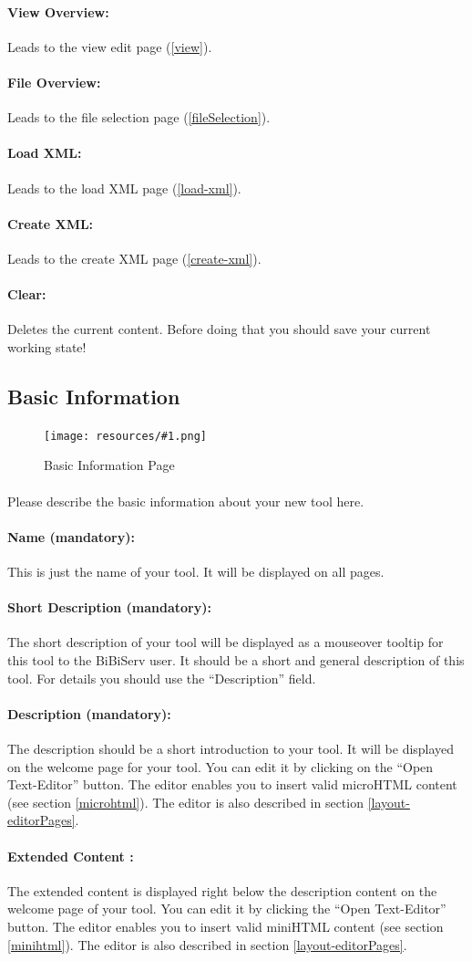 \documentclass[a4paper,10pt]{book}
\newcommand{\bigpic}[1]{\texttt{[image: resources/\#1.png]}}
\newcommand{\shortDescr}[2]{\paragraph{Short Description #2:} The short description of your #1 will be displayed as a mouseover tooltip for this #1 to the BiBiServ user. It should be a short and general description of this #1. For details you should use the ``Description'' field.}
\newcommand{\customContent}[3]{\paragraph{#2 #3:} #1 You can edit it by clicking the ``Open Text-Editor'' button. The editor enables you to insert valid miniHTML content (see section \ref{minihtml}). The editor is also described in section \ref{layout-editorPages}.}
\begin{document}
\paragraph{View Overview:} Leads to the view edit page (\ref{view}).
\paragraph{File Overview:} Leads to the file selection page (\ref{fileSelection}).
\paragraph{Load XML:} Leads to the load XML page (\ref{load-xml}).
\paragraph{Create XML:} Leads to the create XML page (\ref{create-xml}).
\paragraph{Clear:} Deletes the current content. Before doing that you should save your current working state!

\subsection{Basic Information}
\label{basicInfo}

\begin{figure}
 \bigpic{basicInfo}
 \caption{Basic Information Page}
\end{figure}

\paragraph{} Please describe the basic information about your new tool here.
\paragraph{Name (mandatory):} This is just the name of your tool. It will be displayed on all pages.
\shortDescr{tool}{(mandatory)}
\paragraph{Description (mandatory):} The description should be a short introduction to your tool. It will be displayed on the welcome page for your tool. You can edit it by clicking on the ``Open Text-Editor'' button. The editor enables you to insert valid microHTML content (see section \ref{microhtml}). The editor is also described in section \ref{layout-editorPages}.
\customContent{The extended content is displayed right below the description content on the welcome page of your tool.}{Extended Content}{}
\end{document}
